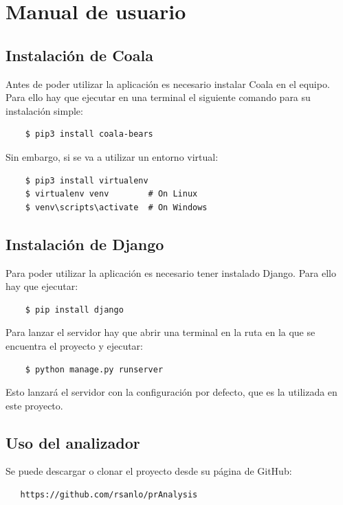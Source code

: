 \documentclass[a4paper, 12pt]{book}
\begin{document}
\cleardoublepage
\appendix
\chapter{Manual de usuario}
\label{app:manual}

\section{Instalación de Coala}
\label{app:inst_coala}
Antes de poder utilizar la aplicación es necesario instalar Coala en el equipo. Para ello hay que ejecutar en una terminal el siguiente comando para su instalación simple:
{\footnotesize
\begin{verbatim}
    $ pip3 install coala-bears
\end{verbatim}
}

Sin embargo, si se va a utilizar un entorno virtual:
{\footnotesize
\begin{verbatim}
    $ pip3 install virtualenv
    $ virtualenv venv        # On Linux
    $ venv\scripts\activate  # On Windows
\end{verbatim}
}

\section{Instalación de Django}
\label{app:inst_Django}
Para poder utilizar la aplicación es necesario tener instalado Django. Para ello hay que ejecutar:
{\footnotesize
\begin{verbatim}
    $ pip install django
\end{verbatim}
}

Para lanzar el servidor hay que abrir una terminal en la ruta en la que se encuentra el proyecto y ejecutar:
{\footnotesize
\begin{verbatim}
    $ python manage.py runserver
\end{verbatim}
}
Esto lanzará el servidor con la configuración por defecto, que es la utilizada en este proyecto.

\section{Uso del analizador}
\label{app:analyzer}
Se puede descargar o clonar el proyecto desde su página de GitHub:
{\footnotesize
\begin{verbatim}
   https://github.com/rsanlo/prAnalysis
\end{verbatim}
}
\end{document}
